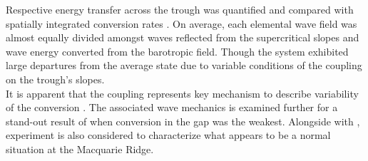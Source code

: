 \documentclass[12pt]{article}
\begin{document}
Respective energy transfer across the trough was quantified and compared with spatially integrated 
conversion rates . On average, each elemental wave field 
was almost equally divided amongst waves reflected from the supercritical slopes and wave energy 
converted from the barotropic field. Though the system exhibited large departures from the average 
state due to variable conditions of the coupling on the trough's slopes.\\

It is apparent that the coupling represents key mechanism to describe variability of the 
conversion . The associated wave mechanics is examined further for a 
stand-out result 
of  when conversion in the gap was the weakest. Alongside with , experiment   
 is also considered to characterize what appears to be a normal situation at the 
Macquarie Ridge.
%

\end{document}
